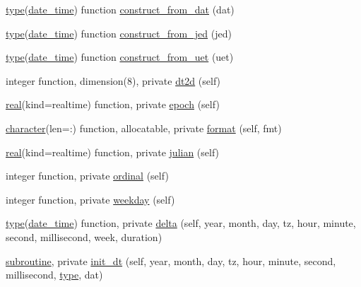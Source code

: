 \begin{DoxyCompactItemize}
\item 
\hyperlink{stop__watch_83_8txt_a70f0ead91c32e25323c03265aa302c1c}{type}(\hyperlink{structm__time__oop_1_1date__time}{date\+\_\+time}) function \hyperlink{namespacem__time__oop_ae43c4146d74863b5aee027ebc0103f48}{construct\+\_\+from\+\_\+dat} (dat)
\item 
\hyperlink{stop__watch_83_8txt_a70f0ead91c32e25323c03265aa302c1c}{type}(\hyperlink{structm__time__oop_1_1date__time}{date\+\_\+time}) function \hyperlink{namespacem__time__oop_ac7d9aa1885c2b8df613541be8a147064}{construct\+\_\+from\+\_\+jed} (jed)
\item 
\hyperlink{stop__watch_83_8txt_a70f0ead91c32e25323c03265aa302c1c}{type}(\hyperlink{structm__time__oop_1_1date__time}{date\+\_\+time}) function \hyperlink{namespacem__time__oop_ae952d7599526f1b2632452d00363add3}{construct\+\_\+from\+\_\+uet} (uet)
\item 
integer function, dimension(8), private \hyperlink{namespacem__time__oop_ac68405e5566d5aec59cd1fba7145130c}{dt2d} (self)
\item 
\hyperlink{read__watch_83_8txt_abdb62bde002f38ef75f810d3a905a823}{real}(kind=realtime) function, private \hyperlink{namespacem__time__oop_a50cb1ad3024b3b44b004382323bea7a9}{epoch} (self)
\item 
\hyperlink{option__stopwatch_83_8txt_abd4b21fbbd175834027b5224bfe97e66}{character}(len=\+:) function, allocatable, private \hyperlink{namespacem__time__oop_a78bb598e3481faa48df9733a3f9ae060}{format} (self, fmt)
\item 
\hyperlink{read__watch_83_8txt_abdb62bde002f38ef75f810d3a905a823}{real}(kind=realtime) function, private \hyperlink{namespacem__time__oop_ae7610f40e1528f79016de9ebbb3a3fd1}{julian} (self)
\item 
integer function, private \hyperlink{namespacem__time__oop_a7845f6da505dff53007df45b5c198081}{ordinal} (self)
\item 
integer function, private \hyperlink{namespacem__time__oop_ad290beea1dd0dc3d34486e8b4cd8a86c}{weekday} (self)
\item 
\hyperlink{stop__watch_83_8txt_a70f0ead91c32e25323c03265aa302c1c}{type}(\hyperlink{structm__time__oop_1_1date__time}{date\+\_\+time}) function, private \hyperlink{namespacem__time__oop_aecd1edc1f6ca447d5381c8092eba7924}{delta} (self, year, month, day, tz, hour, minute, second, millisecond, week, duration)
\item 
\hyperlink{M__stopwatch_83_8txt_acfbcff50169d691ff02d4a123ed70482}{subroutine}, private \hyperlink{namespacem__time__oop_ac81ff1eb27f637a60530d3c5d442fc71}{init\+\_\+dt} (self, year, month, day, tz, hour, minute, second, millisecond, \hyperlink{stop__watch_83_8txt_a70f0ead91c32e25323c03265aa302c1c}{type}, dat)

\end{DoxyCompactItemize}
